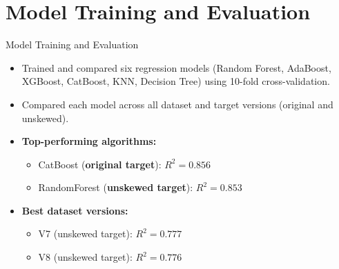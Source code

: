 \documentclass{beamer}
\begin{document}
\section{Model Training and Evaluation}
\begin{frame}{Model Training and Evaluation}
    \begin{itemize}
        \item Trained and compared six regression models (Random Forest,
                AdaBoost, XGBoost, CatBoost, KNN, Decision Tree) using 10-fold
                cross-validation.
        \item Compared each model across all dataset and target versions
                (original and unskewed).
        \item \textbf{Top-performing algorithms:}
        \begin{itemize}
            \item CatBoost (\textbf{original target}): $R^2 = 0.856$
            \item RandomForest (\textbf{unskewed target}): $R^2 = 0.853$
        \end{itemize}
        \item \textbf{Best dataset versions:}
        \begin{itemize}
            \item V7 (unskewed target): $R^2 = 0.777$
            \item V8 (unskewed target): $R^2 = 0.776$
        \end{itemize}
    \end{itemize}
\end{frame}
\end{document}
